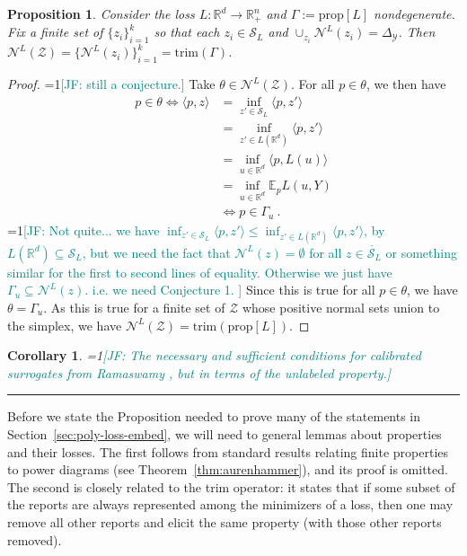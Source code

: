 \documentclass[12pt]{article}
\newcommand{\Comments}{1}
\newcommand{\mynote}[2]{\ifnum\Comments=1\textcolor{#1}{#2}\fi}
\newcommand{\jessie}[1]{\mynote{teal}{[JF: #1]}}
\newcommand{\reals}{\mathbb{R}}
\newcommand{\prop}[1]{\mathrm{prop}[#1]}
\newcommand{\simplex}{\Delta_\Y}
\newcommand{\E}{\mathbb{E}}
\newcommand{\N}{\mathcal{N}}
\newcommand{\Sc}{\mathcal{S}}
\newcommand{\Y}{\mathcal{Y}}
\newcommand{\inprod}[2]{\langle #1, #2 \rangle}%
\newcommand{\inter}[1]{\mathring{#1}}%
\newcommand{\trim}{\mathrm{trim}}
\newtheorem{proposition}{Proposition}
\newtheorem{corollary}{Corollary}
\begin{document}
\begin{proposition}
	Consider the loss $L:\reals^d \to \reals^n_+$ and $\Gamma := \prop{L}$ nondegenerate.
	Fix a finite set of $\{z_i\}_{i=1}^k$ so that each $z_i \in \Sc_L$ and $\cup_{z_i} \N^L(z_i) = \simplex$.
	Then $\N^L(\mathcal{Z}) = \{\N^L(z_i)\}_{i=1}^k = \trim(\Gamma)$.
\end{proposition}
\begin{proof}
  \jessie{still a conjecture.}
  Take $\theta \in \N^L(\mathcal{Z})$.
  For all $p \in \theta$, we then have 
  \begin{align*}
  p \in \theta \iff \inprod{p}{z} &= \inf_{z' \in \Sc_L} \inprod{p}{z'}\\
  &= \inf_{z' \in L(\reals^d)} \inprod{p}{z'}\\
  &= \inf_{u \in \reals^d} \inprod{p}{L(u)}\\
  &= \inf_{u\in \reals^d} \E_p L(u, Y)\\
  &\iff p \in \Gamma_u~.~
  \end{align*}
  \jessie{Not quite... we have $\inf_{z' \in \Sc_L} \inprod{p}{z'} \leq \inf_{z' \in L(\reals^d)} \inprod{p}{z'}$, by $L(\reals^d) \subseteq \Sc_L$, but we need the fact that $\N^L(z) = \emptyset$ for all $z \in \inter{\Sc_L}$ or something similar for the first to second lines of equality.  Otherwise we just have $\Gamma_u \subseteq \N^L(z)$.  i.e. we need Conjecture 1.
  }
  Since this is true for all $p \in \theta$, we have $\theta = \Gamma_u$.
  As this is true for a finite set of $\mathcal{Z}$ whose positive normal sets union to the simplex, we have $\N^L(\mathcal{Z}) = \trim(\prop{L})$.
\end{proof}

\begin{corollary}
	\jessie{The necessary and sufficient conditions for calibrated surrogates from Ramaswamy \cite{ramaswamy2016convex}, but in terms of the unlabeled property.}
\end{corollary}
\hrule

Before we state the Proposition needed to prove many of the statements in Section~\ref{sec:poly-loss-embed}, we will need to general lemmas about properties and their losses.
The first follows from standard results relating finite properties to power diagrams (see Theorem~\ref{thm:aurenhammer}), and its proof is omitted.
The second is closely related to the trim operator: it states that if some subset of the reports are always represented among the minimizers of a loss, then one may remove all other reports and elicit the same property (with those other reports removed).
\end{document}
